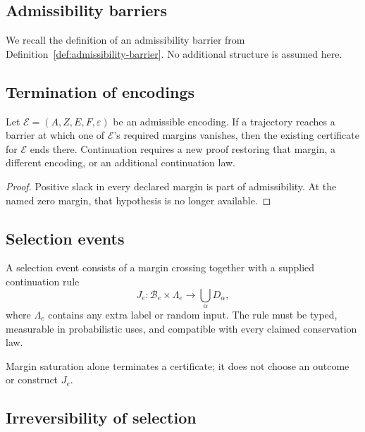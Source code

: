 \documentclass[11pt]{article}
\theoremstyle{plain}
\theoremstyle{plain}
\begin{document}
\subsection{Admissibility barriers}

We recall the definition of an admissibility barrier from
Definition~\ref{def:admissibility-barrier}.
No additional structure is assumed here.

\subsection{Termination of encodings}

\begin{proposition}
Let $\mathcal{E}=(A,Z,E,F,\varepsilon)$ be an admissible encoding.
If a trajectory reaches a barrier at which one of $\mathcal E$'s required
margins vanishes, then the existing certificate for $\mathcal E$ ends there.
Continuation requires a new proof restoring that margin, a different
encoding, or an additional continuation law.
\end{proposition}

\begin{proof}
Positive slack in every declared margin is part of admissibility.  At the
named zero margin, that hypothesis is no longer available.
\end{proof}

\subsection{Selection events}

\begin{definition}
A selection event consists of a margin crossing together with a supplied
continuation rule
\[
J_e:\mathcal B_e\times\Lambda_e\longrightarrow
\bigcup_\alpha D_\alpha,
\]
where $\Lambda_e$ contains any extra label or random input.  The rule must be
typed, measurable in probabilistic uses, and compatible with every claimed
conservation law.
\end{definition}

Margin saturation alone terminates a certificate; it does not choose an
outcome or construct $J_e$.

\subsection{Irreversibility of selection}
\end{document}
